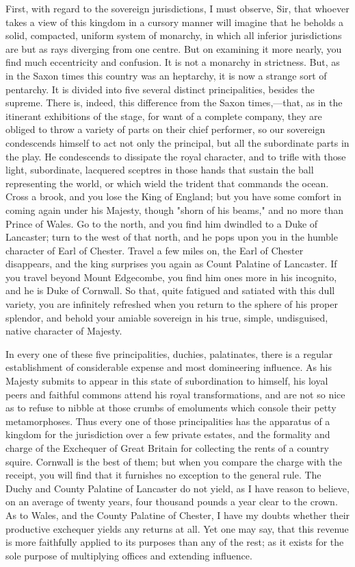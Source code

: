 First, with regard to the sovereign jurisdictions, I must observe, Sir, that whoever takes a view of this kingdom in a cursory manner will imagine that he beholds a solid, compacted, uniform system of monarchy, in which all inferior jurisdictions are but as rays diverging from one centre. But on examining it more nearly, you find much eccentricity and confusion. It is not a monarchy in strictness. But, as in the Saxon times this country was an heptarchy, it is now a strange sort of pentarchy. It is divided into five several distinct principalities, besides the supreme. There is, indeed, this difference from the Saxon times,—that, as in the itinerant exhibitions of the stage, for want of a complete company, they are obliged to throw a variety of parts on their chief performer, so our sovereign condescends himself to act not only the principal, but all the subordinate parts in the play. He condescends to dissipate the royal character, and to trifle with those light, subordinate, lacquered sceptres in those hands that sustain the ball representing the world, or which wield the trident that commands the ocean. Cross a brook, and you lose the King of England; but you have some comfort in coming again under his Majesty, though "shorn of his beams," and no more than Prince of Wales. Go to the north, and you find him dwindled to a Duke of Lancaster; turn to the west of that north, and he pops upon you in the humble character of Earl of Chester. Travel a few miles on, the Earl of Chester disappears, and the king surprises you again as Count Palatine of Lancaster. If you travel beyond Mount Edgecombe, you find him ones more in his incognito, and he is Duke of Cornwall. So that, quite fatigued and satiated with this dull variety, you are infinitely refreshed when you return to the sphere of his proper splendor, and behold your amiable sovereign in his true, simple, undisguised, native character of Majesty.

In every one of these five principalities, duchies, palatinates, there is a regular establishment of considerable expense and most domineering influence. As his Majesty submits to appear in this state of subordination to himself, his loyal peers and faithful commons attend his royal transformations, and are not so nice as to refuse to nibble at those crumbs of emoluments which console their petty metamorphoses. Thus every one of those principalities has the apparatus of a kingdom for the jurisdiction over a few private estates, and the formality and charge of the Exchequer of Great Britain for collecting the rents of a country squire. Cornwall is the best of them; but when you compare the charge with the receipt, you will find that it furnishes no exception to the general rule. The Duchy and County Palatine of Lancaster do not yield, as I have reason to believe, on an average of twenty years, four thousand pounds a year clear to the crown. As to Wales, and the County Palatine of Chester, I have my doubts whether their productive exchequer yields any returns at all. Yet one may say, that this revenue is more faithfully applied to its purposes than any of the rest; as it exists for the sole purpose of multiplying offices and extending influence.

